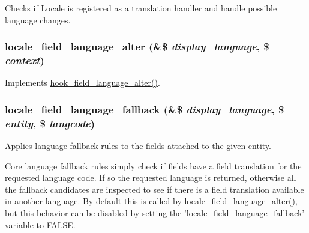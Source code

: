 Checks if Locale is registered as a translation handler and handle possible language changes. \hypertarget{locale_8module_a2e2bf06bf347a63df595c58aad152428}{
\subsubsection[{locale\_\-field\_\-language\_\-alter}]{\setlength{\rightskip}{0pt plus 5cm}locale\_\-field\_\-language\_\-alter (\&\$ {\em display\_\-language}, \/  \$ {\em context})}}
\label{locale_8module_a2e2bf06bf347a63df595c58aad152428}
Implements \hyperlink{group__field__attach_ga6411d5b5a528850a6e53c87ff899cabc}{hook\_\-field\_\-language\_\-alter()}. \hypertarget{locale_8module_a434eb64757d6496331a45365258fbecc}{
\subsubsection[{locale\_\-field\_\-language\_\-fallback}]{\setlength{\rightskip}{0pt plus 5cm}locale\_\-field\_\-language\_\-fallback (\&\$ {\em display\_\-language}, \/  \$ {\em entity}, \/  \$ {\em langcode})}}
\label{locale_8module_a434eb64757d6496331a45365258fbecc}
Applies language fallback rules to the fields attached to the given entity.

Core language fallback rules simply check if fields have a field translation for the requested language code. If so the requested language is returned, otherwise all the fallback candidates are inspected to see if there is a field translation available in another language. By default this is called by \hyperlink{locale_8module_a2e2bf06bf347a63df595c58aad152428}{locale\_\-field\_\-language\_\-alter()}, but this behavior can be disabled by setting the 'locale\_\-field\_\-language\_\-fallback' variable to FALSE.


